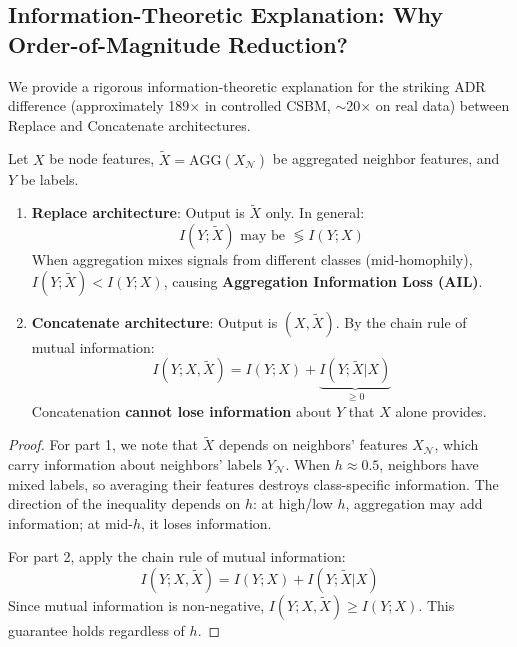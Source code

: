 \subsection{Information-Theoretic Explanation: Why Order-of-Magnitude Reduction?}
\label{subsec:information_theoretic_explanation}

We provide a rigorous information-theoretic explanation for the striking ADR difference (approximately 189$\times$ in controlled CSBM, $\sim$20$\times$ on real data) between Replace and Concatenate architectures.

\begin{theorem}
\label{thm:concat_information}
Let $X$ be node features, $\tilde{X} = \text{AGG}(X_{\mathcal{N}})$ be aggregated neighbor features, and $Y$ be labels.

\begin{enumerate}
    \item \textbf{Replace architecture}: Output is $\tilde{X}$ only. In general:
    \begin{equation}
        I(Y; \tilde{X}) \text{ may be } \lessgtr I(Y; X)
    \end{equation}
    When aggregation mixes signals from different classes (mid-homophily), $I(Y; \tilde{X}) < I(Y; X)$, causing \textbf{Aggregation Information Loss (AIL)}.

    \item \textbf{Concatenate architecture}: Output is $(X, \tilde{X})$. By the chain rule of mutual information:
    \begin{equation}
        I(Y; X, \tilde{X}) = I(Y; X) + \underbrace{I(Y; \tilde{X} | X)}_{\geq 0}
    \end{equation}
    Concatenation \textbf{cannot lose information} about $Y$ that $X$ alone provides.
\end{enumerate}
\end{theorem}

\begin{proof}
For part 1, we note that $\tilde{X}$ depends on neighbors' features $X_{\mathcal{N}}$, which carry information about neighbors' labels $Y_{\mathcal{N}}$. When $h \approx 0.5$, neighbors have mixed labels, so averaging their features destroys class-specific information. The direction of the inequality depends on $h$: at high/low $h$, aggregation may add information; at mid-$h$, it loses information.

For part 2, apply the chain rule of mutual information:
\begin{equation}
    I(Y; X, \tilde{X}) = I(Y; X) + I(Y; \tilde{X} | X)
\end{equation}
Since mutual information is non-negative, $I(Y; X, \tilde{X}) \geq I(Y; X)$. This guarantee holds regardless of $h$.
\end{proof}

